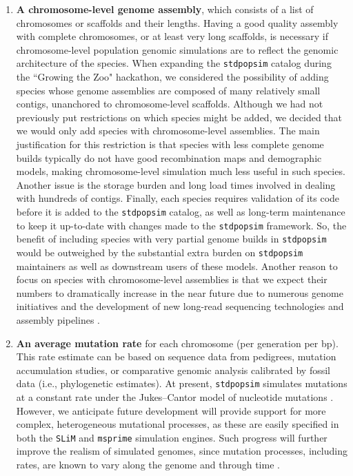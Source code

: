 \documentclass[hidelinks]{article}
\newcommand{\stdpopsim}{\texttt{stdpopsim}\xspace}
\begin{document}
\begin{enumerate}
\def\labelenumi{\arabic{enumi}.}

\item
  \textbf{A chromosome-level genome assembly}, which consists of a list of chromosomes or scaffolds and their lengths. 
  Having a good quality assembly with complete chromosomes, or at least very long scaffolds, 
  is necessary if chromosome-level population genomic simulations are to reflect the genomic architecture of the species.
  When expanding the \stdpopsim catalog during the ``Growing the Zoo" hackathon,
  we considered the possibility of adding species whose genome assemblies are composed of many relatively small contigs,
  unanchored to chromosome-level scaffolds.
  Although we had not previously put restrictions on which species might be added,
  we decided that we would only add species with chromosome-level assemblies.
  The main justification for this restriction is that
  species with less complete genome builds typically do not have good 
  recombination maps 
  and demographic models,
  making chromosome-level simulation much less useful in such species.
  Another issue is the storage burden and long load times involved in dealing with
  hundreds of contigs.
  Finally, each species requires validation of its code before it is added to the \stdpopsim catalog,
  as well as long-term maintenance to keep it up-to-date with changes made to the \stdpopsim framework.
  So, the benefit of including species with very partial genome builds in \stdpopsim
  would be outweighed by the substantial extra burden on \stdpopsim maintainers
  as well as downstream users of these models.  
  Another reason to focus on species with chromosome-level assemblies is that we
  expect their numbers to dramatically increase in the near future due to numerous genome initiatives \citep{Lewin2022,Rhie2021,Cheng2018}
  and the development of new long-read sequencing technologies and assembly pipelines
  \citep{Chakraborty2016,Amarasinghe2020,Amarasinghe2021}. 
  

\item
  \textbf{An average mutation rate} for each chromosome (per generation per bp).
  This rate estimate can be based on sequence data from pedigrees, mutation accumulation studies, 
  or comparative genomic analysis calibrated by fossil data (i.e., phylogenetic estimates).
  At present, \stdpopsim simulates mutations at a constant rate under the Jukes--Cantor model of nucleotide mutations \citep{Jukes1969}.
  However, we anticipate future development will provide support for more complex, heterogeneous mutational processes,
  as these are easily specified in both the \texttt{SLiM} and \texttt{msprime} simulation engines.
  Such progress will further improve the realism of simulated genomes,
  since mutation processes, including rates, are known to vary along the genome and through time \citep{Benzer1961,Ellegren2003,Supek2019}.


\end{enumerate}
\end{document}

